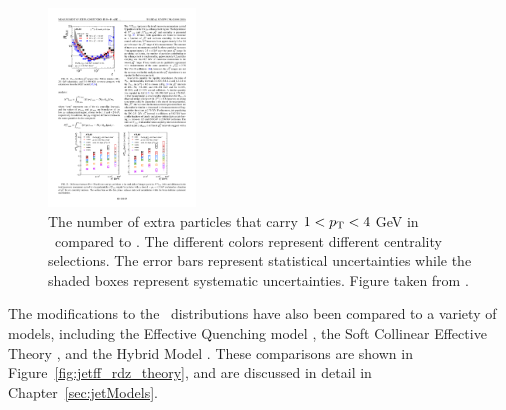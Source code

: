 

\begin{figure}[htbp]
\begin{center}
\includegraphics[width=0.35\textwidth]{figures/jetMeasurements/jetff_nch}
\caption{The number of extra particles that carry $1<\mbox{$p_{\mathrm{T}}$}<4$ GeV  in \pbpb\ compared to \pp.
The different colors represent different centrality selections.
The error bars represent statistical uncertainties while the shaded boxes represent systematic uncertainties.
Figure taken from \cite{PhysRevC.98.024908}.}
\label{fig:jetff_nch}
\end{center}
\end{figure}

The modifications to the \Dz\ distributions have also been compared to a variety of models, including the Effective Quenching model \cite{Spousta:2015fca}, the Soft Collinear Effective Theory \cite{Chien:2015vja, Kang:2017frl}, and the Hybrid Model \cite{Casalderrey-Solana:2014bpa}.
These comparisons are shown in Figure~\ref{fig:jetff_rdz_theory}, and are discussed in detail in Chapter~\ref{sec:jetModels}.


